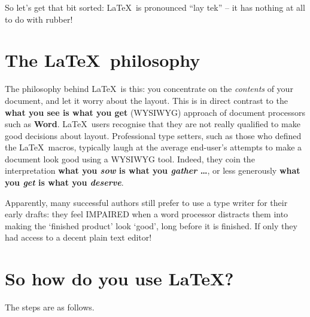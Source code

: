 \documentclass[12pt,a4paper]{article}
\begin{document}

So let's get that bit sorted: \LaTeX\ is pronounced ``lay tek'' -- it has
nothing at all to do with rubber!

\section{The \LaTeX\ philosophy}




The philosophy behind \LaTeX\ is this: you concentrate on the \emph{contents}
of your document, and let it worry about the layout. This is in direct
contrast to the \textbf{what you see is what you get} (WYSIWYG) approach of
document processors such as \textbf{Word}. \LaTeX\ users recognise that they
are not really qualified to make good decisions about layout. Professional
type setters, such as those who defined the \LaTeX\ macros, typically laugh at
the average end-user's attempts to make a document look good using a WYSIWYG
tool. Indeed, they coin the interpretation \textbf{what you \emph{sow} is what
you \emph{gather} \ldots}, or less generously \textbf{what you \emph{get} is
what you \emph{deserve}}.

Apparently, many successful authors still prefer to use a type writer for
their early drafts: they feel IMPAIRED when a word processor distracts them
into making the `finished product' look `good', long before it is finished. If
only they had access to a decent plain text editor!

\section{So how do you use \LaTeX?}

The steps are as follows.

\end{document}
